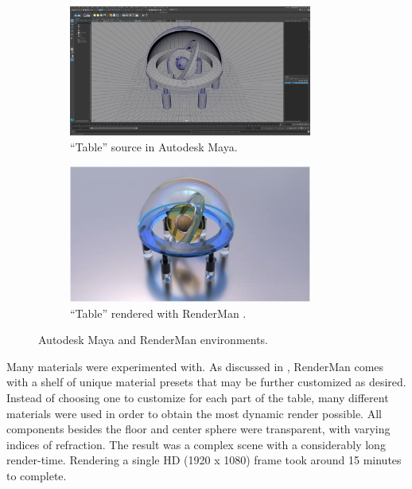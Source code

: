 \documentclass[conference]{IEEEtran}
\begin{document}
\begin{figure}[h!]
\centering
\begin{subfigure}{.5\textwidth}
\begin{center}
\begin{minipage}[t]{\linewidth}
\centerline{\includegraphics[width=8cm]{project1.png}}
\caption{``Table'' source in Autodesk Maya.}
\label{fig:environment}
\end{minipage}
\end{center}
\end{subfigure}
\par\bigskip
\begin{subfigure}{.5\textwidth}
\begin{center}
\begin{minipage}[t]{\linewidth}
\centerline{\includegraphics[width=8cm]{table.png}}
\caption{``Table'' rendered with RenderMan \cite{animation}.}
\label{fig:table}
\end{minipage}
\end{center}
\end{subfigure}
\caption{Autodesk Maya and RenderMan environments.}
\label{fig:table_pair}
\end{figure}

Many materials were experimented with. As discussed in \cite{renderman},
RenderMan comes with a shelf of unique material presets that may be further customized as desired.
Instead of choosing one to customize for each part of the table,
many different materials were used in order to obtain the most dynamic render possible.
All components besides the floor and center sphere were transparent, with varying indices of refraction.
The result was a complex scene with a considerably long render-time.
Rendering a single HD (1920 x 1080) frame took around 15 minutes to complete.
\end{document}
